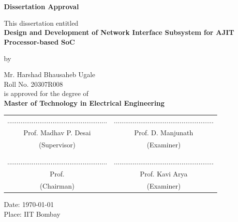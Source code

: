 \documentclass[12pt]{report}
\begin{document}
\newpage
{}
\chapter*{}
\begin{center}
{\Large \textbf{Dissertation Approval}}

\bigskip
\bigskip
\bigskip
This dissertation entitled\\
\bigskip
\textbf{Design and Development of Network Interface Subsystem for AJIT Processor-based SoC}\\
\bigskip

by\\
\bigskip

Mr. Harshad Bhausaheb Ugale\\
Roll No. 20307R008\\
\bigskip
is   approved for the degree of\\
\textbf{Master of Technology in Electrical Engineering}\\

\end{center}
 \vspace{10mm}
\begingroup
\setlength{\tabcolsep}{30pt}
\begin{center}
    \begin{tabular}{c c}
        ..................................................... & .....................................................\\
        Prof. Madhav P. Desai & Prof. D. Manjunath\\
        (Supervisor)     & (Examiner)\\
        \\\\
        ..................................................... & .....................................................\\
        Prof.   & Prof. Kavi Arya\\
        (Chairman) & (Examiner)\\
    \end{tabular}
\end{center}
\endgroup
\bigskip
{Date: \today}\\
{Place: IIT Bombay}


\newpage
\end{document}
